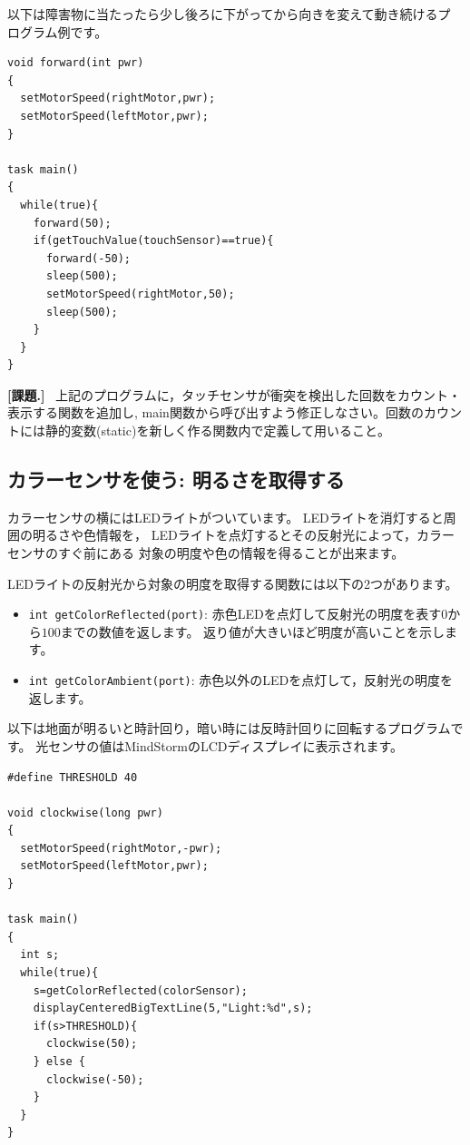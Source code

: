 \documentclass[11pt]{jsarticle}
\makeatletter
\newcounter{wnum}[section]
\def\thewnum{課題\thesection.\the\c@wnum}
\def\work{\refstepcounter{wnum}%
  \vspace{3mm}\noindent\textbf{[\thewnum]}~}
\makeatother
\begin{document}
以下は障害物に当たったら少し後ろに下がってから向きを変えて動き続けるプ
ログラム例です。

\begin{lstlisting}
void forward(int pwr)
{
  setMotorSpeed(rightMotor,pwr);
  setMotorSpeed(leftMotor,pwr);
}

task main()
{
  while(true){
    forward(50);
    if(getTouchValue(touchSensor)==true){
      forward(-50);
      sleep(500);
      setMotorSpeed(rightMotor,50);
      sleep(500);
    }
  }
}
\end{lstlisting}

\work
上記のプログラムに，タッチセンサが衝突を検出した回数をカウント・表示する関数を追加し, main関数から呼び出すよう修正しなさい。回数のカウントには静的変数(static)を新しく作る関数内で定義して用いること。



\subsection{カラーセンサを使う: 明るさを取得する}

カラーセンサの横にはLEDライトがついています。
LEDライトを消灯すると周囲の明るさや色情報を，
LEDライトを点灯するとその反射光によって，カラーセンサのすぐ前にある
対象の明度や色の情報を得ることが出来ます。

LEDライトの反射光から対象の明度を取得する関数には以下の2つがあります。
\begin{itemize}
\item
{}\verb|int getColorReflected(port)|:
赤色LEDを点灯して反射光の明度を表す$0$から$100$までの数値を返します。
返り値が大きいほど明度が高いことを示します。
\item {}\verb|int getColorAmbient(port)|:
赤色以外のLEDを点灯して，反射光の明度を返します。
\end{itemize}
以下は地面が明るいと時計回り，暗い時には反時計回りに回転するプログラムです。
光センサの値はMindStormのLCDディスプレイに表示されます。

\begin{lstlisting}
#define THRESHOLD 40

void clockwise(long pwr)
{
  setMotorSpeed(rightMotor,-pwr);
  setMotorSpeed(leftMotor,pwr);
}

task main()
{
  int s;
  while(true){
    s=getColorReflected(colorSensor);
    displayCenteredBigTextLine(5,"Light:%d",s);
    if(s>THRESHOLD){
      clockwise(50);
    } else {
      clockwise(-50);
    }
  }
}
\end{lstlisting}
\end{document}
